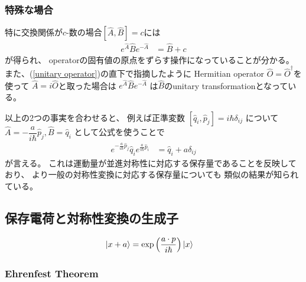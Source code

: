 \subsubsection{特殊な場合}

特に交換関係が$c$-数の場合$[\hat{A}, \hat{B}] = c$には
\begin{align}
    e^{ \hat{A} } \hat{B} e^{ - \hat{A} }
    &=
    \hat{B} + c
\label{finite translation of operator}
\end{align}
が得られ、
operatorの固有値の原点をずらす操作になっていることが分かる。
また、(\ref{unitary operator})の直下で指摘したように
Hermitian operator $\hat{O} = \hat{O}^\dagger$を使って
$\hat{A} = i \hat{O}$と取った場合は
$ e^{ \hat{A} } \hat{B} e^{ - \hat{A} } $
は$\hat{B}$のunitary transformationとなっている。

以上の2つの事実を合わせると、
例えば正準変数
$[\hat{q}_i, \hat{p}_j] = i\hbar\delta_{ij}$
について$\hat{A} = - \dfrac{a}{i\hbar} \hat{p}_j,
\hat{B} = \hat{q}_i$
として公式を使うことで
\begin{align}
    e^{ - \frac{a}{i\hbar} \hat{p}_j }
        \hat{q}_i
    e^{ \frac{a}{i\hbar} \hat{p}_i }
    &=
    \hat{q}_i + a \delta_{ij}
\end{align}
が言える。
これは運動量が並進対称性に対応する保存量であることを反映しており、
より一般の対称性変換に対応する保存量についても
類似の結果が知られている。

\newpage
\subsection{保存電荷と対称性変換の生成子}

\begin{align}
    \ket{ x + a }
    &=
    \exp\left(
        \dfrac{ a \cdot p }
        { i\hbar }
    \right)
    \ket{ x }
\end{align}

\subsubsection{Ehrenfest Theorem}

